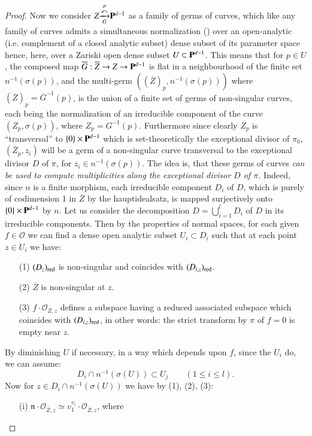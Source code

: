 \begin{proof}
Now we consider $Z {\displaystyle\mathop{\xrightarrow{\curvearrowleft}}^\sigma_G} \mathbf{P}^{d-1}$ as a family of germs of curves, which like any family of curves admits a simultaneous normalization (\cite{art06-keyD.C.N.}) over an open-analytic (i.e. complement of a closed analytic subset) dense subset of its parameter space hence, here, over a Zariski open dense subset $U \subset \mathbf{P}^{d-1}$. This means that for $p \in U$, the composed map $\overline{G}: \overline{Z} \to Z \to \mathbf{P}^{d-1}$ is flat in a neighbourhood of the finite set $n^{-1}(\sigma(p))$, and the multi-germ $((\overline{Z})_p, n^{-1} (\sigma(p)))$ where $(\overline{Z})_p = \overline{G}^{-1} (p)$, is the union of a finite set of germs of non-singular curves, each being the normalization of an irreducible component of the curve $(Z_p, \sigma(p))$, where $Z_p = G^{-1}(p)$. Furthermore since clearly $Z_p$ is ``transversal'' to $\{0\} \times \mathbf{P}^{d-1}$ which is set-theoretically the exceptional divisor of $\pi_0$, $(\overline{Z}_p, z_i)$ will be a germ of a non-singular curve transversal to the exceptional divisor $D$ of $\pi$, for $z_i \in n^{-1}(\sigma (p))$. The idea is, that these germs of curves {\em can be used to compute multiplicities along the exceptional divisor $D$ of $\pi$.} Indeed, since $n$ is a finite morphism, each irreducible component $D_i$ of $D$, which is purely of codimension 1 in $\overline{Z}$ by the hauptidealsatz, is mapped surjectively onto $\{0\} \times \mathbf{P}^{d-1}$ by $n$. Let us consider the decomposition $D = \bigcup\limits^l_{i=1} D_i$ of $D$ in its irreducible components. Then by the properties of normal spaces, for each given $f \in \mathcal{O}$ we can find a dense open analytic subset $U_i \subset D_i$ such that at each point $z \in U_i$ we have:
\begin{itemize}
\itemsep=0pt
\item[(1)] $(D_z)_{\operatorname{red}}$ is non-singular and coincides with $(D_{i,z})_{\operatorname{red}}$.

\item[(2)] $\overline{Z}$ is non-singular at $z$.

\item[(3)] $f \cdot \mathcal{O}_{\overline{Z}, z}$ defines a subspace having a reduced associated subspace which coincides with $(D_{i,z})_{\operatorname{red}}$, in other words: the strict transform by $\pi$ of $f=0$ is empty near $z$.
\end{itemize}
By diminishing $U$ if necessary, in a way which depends upon $f$, since the $U_i$ do, we can assume:
$$
D_i \cap n^{-1}(\sigma (U)) \subset U_j \qquad (1 \leqslant i \leqslant l).
$$\pageoriginale 
Now for $z\in D_i \cap n^{-1} (\sigma (U))$ we have by (1), (2), (3):
\begin{itemize}
\itemsep=0pt
\item[(i)] $\mathfrak{n} \cdot \mathcal{O}_{\overline{Z}, z} \simeq v^{v_i}_1 \cdot \mathcal{O}_{\overline{Z}, z}$, where 


\end{itemize}
\end{proof}
